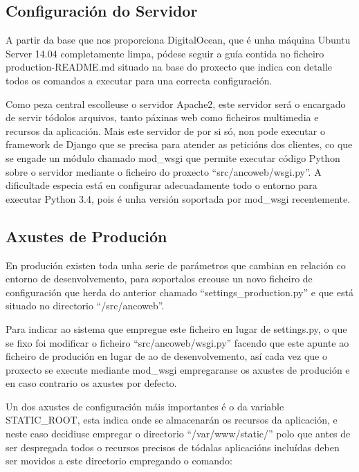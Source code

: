     \subsection{Configuración do Servidor}
        A partir da base que nos proporciona DigitalOcean, que é unha máquina Ubuntu Server 14.04 
        completamente limpa, pódese seguir a guía contida no ficheiro production-README.md situado
        na base do proxecto que indica con detalle todos os comandos a executar para una correcta 
        configuración. 
        
        Como peza central escolleuse o servidor Apache2, este servidor será o encargado de servir 
        tódolos arquivos, tanto páxinas web como ficheiros multimedia e recursos da aplicación. Mais
        este servidor de por si só, non pode executar o framework de Django que se precisa para 
        atender as peticións dos clientes, co que se engade un módulo chamado mod\_wsgi
        que permite executar código Python sobre o servidor mediante o ficheiro do proxecto
        ``src/ancoweb/wsgi.py''. A dificultade especia está en configurar adecuadamente todo o entorno
        para executar Python 3.4, pois é unha versión soportada por mod\_wsgi recentemente.
        
    \subsection{Axustes de Produción}
        En produción existen toda unha serie de parámetros que cambian en relación co entorno de 
        desenvolvemento, para soportalos creouse un novo ficheiro de configuración que herda do 
        anterior chamado ``settings\_production.py'' e que está situado no directorio 
        ``/src/ancoweb''.
        
        Para indicar ao sistema que empregue este ficheiro en lugar de settings.py, o que se fixo 
        foi modificar o ficheiro ``src/ancoweb/wsgi.py'' facendo que este apunte ao ficheiro de 
        produción en lugar de ao de desenvolvemento, así cada vez que o proxecto se execute mediante
        mod\_wsgi empregaranse os axustes de produción e en caso contrario os axustes por defecto.
        
        Un dos axustes de configuración máis importantes é o da variable STATIC\_ROOT, esta indica
        onde se almacenarán os recursos da aplicación, e neste caso decidiuse empregar o directorio
        ``/var/www/static/'' polo que antes de ser despregada todos o recursos precisos de tódalas 
        aplicacións incluídas deben ser movidos a este directorio empregando o comando:
        
